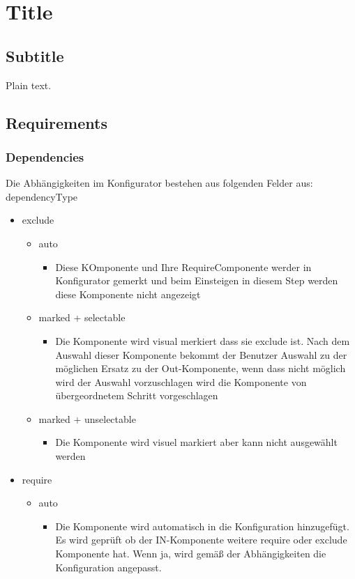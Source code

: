 \documentclass{article}
\begin{document}
\section{Title}

\subsection{Subtitle}

Plain text.

\subsection{Requirements}

\subsubsection{Dependencies}

Die Abhängigkeiten im Konfigurator bestehen aus folgenden Felder aus:
dependencyType

\begin{itemize} 
  \item exclude
  \begin{itemize}
    \item auto 
    \begin{itemize}
      \item Diese KOmponente und Ihre RequireComponente werder in Konfigurator
      gemerkt und beim Einsteigen in diesem Step werden diese Komponente nicht
      angezeigt
    
    \end{itemize}
    \item marked + selectable
    \begin{itemize}
      \item Die Komponente wird visual merkiert dass sie exclude ist. Nach dem
      Auswahl dieser Komponente bekommt der Benutzer Auswahl zu der möglichen
      Ersatz zu der Out-Komponente, wenn dass nicht m\"oglich wird der Auswahl
      vorzuschlagen wird die Komponente von \"ubergeordnetem Schritt
      vorgeschlagen
    \end{itemize}
    \item marked + unselectable
    \begin{itemize}
      \item Die Komponente wird visuel markiert aber kann nicht ausgew\"ahlt
     werden
    \end{itemize}
  \end{itemize}
\item require
  \begin{itemize}
    \item auto
    \begin{itemize}
      \item Die Komponente wird automatisch in die Konfiguration hinzugef\"ugt.
      Es wird gepr\"uft ob der IN-Komponente weitere require oder exclude
      Komponente hat. Wenn ja, wird gem\"a\ss{} der Abh\"angigkeiten die
      Konfiguration angepasst.
    \end{itemize}
  \end{itemize}
\end{itemize}
\end{document}

